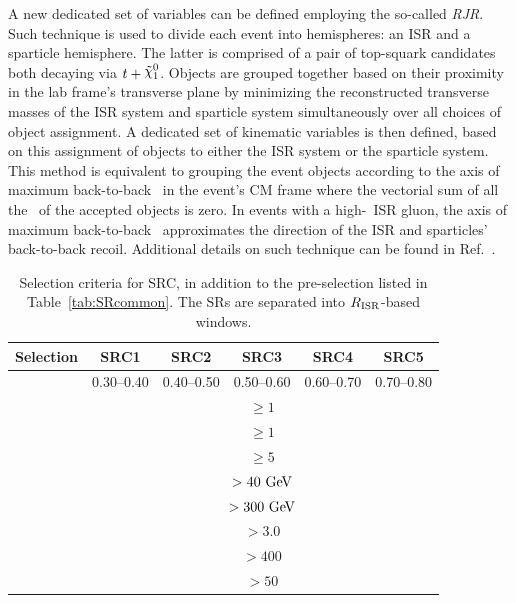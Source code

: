 				A new dedicated set of variables can be defined employing the so-called \emph{\ac{RJR}}. Such technique is used to divide each event into hemispheres: an \ac{ISR} and a sparticle hemisphere. The latter is comprised of a pair of top-squark candidates both decaying via $t + \ninoone$. Objects are grouped together based on their proximity in the lab frame's transverse plane by minimizing the reconstructed transverse masses of the \ac{ISR} system and sparticle system simultaneously over all choices of object assignment. A dedicated set of kinematic variables is then defined, based on this assignment of objects to either the \ac{ISR} system or the sparticle system. This method is equivalent to grouping the event objects according to the axis of maximum back-to-back \pt\ in the event's \ac{CM} frame where the vectorial sum of all the \pt\ of the accepted objects is zero. In events with a high-\pT\ \ac{ISR} gluon, the axis of maximum back-to-back \pt\ approximates the direction of the \ac{ISR} and sparticles' back-to-back recoil. Additional details on such technique can be found in Ref.~\cite{RJR_ISR}.
				\begin{table}[htpb]
				  \caption{Selection criteria for SRC, in addition to the pre-selection listed in Table~\ref{tab:SRcommon}. The \acp{SR} are separated into $R_{\mathrm{ISR}}$-based windows.}
				  \begin{center}
				    \def\arraystretch{1.5}
				    \begin{tabular}{lccccc} \toprule
				      {\textbf{Selection}} & \textbf{SRC1} & \textbf{SRC2} & \textbf{SRC3} & \textbf{SRC4} & \textbf{SRC5} \\ \toprule
				      \rISR & 0.30--0.40 & 0.40--0.50 & 0.50--0.60 & 0.60--0.70 & 0.70--0.80\\ \midrule %
				      \nBJet & \multicolumn{5}{c}{$\ge1$} \\ %
				      \nBJetS & \multicolumn{5}{c}{$\ge1$} \\ %
				      \nJetS & \multicolumn{5}{c}{$\ge5$}  \\ %
				      \pTSBZero & \multicolumn{5}{c}{$>40\gev$}  \\ %
				      \mS & \multicolumn{5}{c}{$>300\gev$}  \\ %
				      \dPhiISRMET & \multicolumn{5}{c}{$>3.0$}  \\ %
				      \pTISR & \multicolumn{5}{c}{$>400$ \gev}   \\ %
				      \pTSFour & \multicolumn{5}{c}{$>50$ \gev}   \\ \bottomrule
				    \end{tabular}
				  \end{center}
				  \label{tab:SignalRegionC}
				\end{table}


